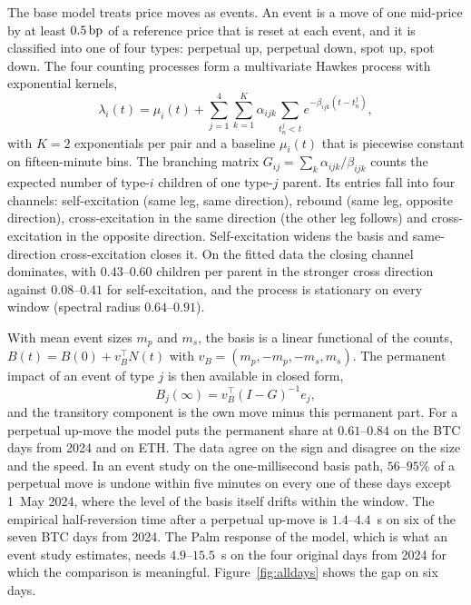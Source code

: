 \documentclass[a4paper,11pt]{article}
\begin{document}
The base model treats price moves as events. An event is a move of one mid-price by at least $0.5\,\mathrm{bp}$ of a reference price that is reset at each event, and it is classified into one of four types: perpetual up, perpetual down, spot up, spot down. The four counting processes form a multivariate Hawkes process \cite{hawkes1971,bacry2015} with exponential kernels,
\begin{equation}\label{eq:linear}
\lambda_i(t) = \mu_i(t) + \sum_{j=1}^{4} \sum_{k=1}^{K} \alpha_{ijk} \sum_{t^j_n < t} e^{-\beta_{ijk}(t - t^j_n)},
\end{equation}
with $K = 2$ exponentials per pair and a baseline $\mu_i(t)$ that is piecewise constant on fifteen-minute bins. The branching matrix $G_{ij} = \sum_k \alpha_{ijk}/\beta_{ijk}$ counts the expected number of type-$i$ children of one type-$j$ parent. Its entries fall into four channels: self-excitation (same leg, same direction), rebound (same leg, opposite direction), cross-excitation in the same direction (the other leg follows) and cross-excitation in the opposite direction. Self-excitation widens the basis and same-direction cross-excitation closes it. On the fitted data the closing channel dominates, with $0.43$--$0.60$ children per parent in the stronger cross direction against $0.08$--$0.41$ for self-excitation, and the process is stationary on every window (spectral radius $0.64$--$0.91$).

With mean event sizes $m_p$ and $m_s$, the basis is a linear functional of the counts, $B(t) = B(0) + v_B^\top N(t)$ with $v_B = (m_p, -m_p, -m_s, m_s)$. The permanent impact of an event of type $j$ is then available in closed form,
\begin{equation}\label{eq:permanent}
B_j(\infty) = v_B^\top (I - G)^{-1} e_j ,
\end{equation}
and the transitory component is the own move minus this permanent part. For a perpetual up-move the model puts the permanent share at $0.61$--$0.84$ on the BTC days from 2024 and on ETH. The data agree on the sign and disagree on the size and the speed. In an event study on the one-millisecond basis path, $56$--$95\%$ of a perpetual move is undone within five minutes on every one of these days except 1~May 2024, where the level of the basis itself drifts within the window. The empirical half-reversion time after a perpetual up-move is $1.4$--$4.4$~s on six of the seven BTC days from 2024. The Palm response of the model, which is what an event study estimates, needs $4.9$--$15.5$~s on the four original days from 2024 for which the comparison is meaningful. Figure~\ref{fig:alldays} shows the gap on six days.
\end{document}
